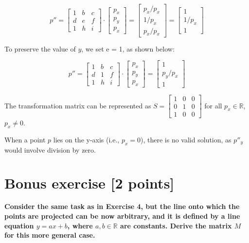 \documentclass{article}
\begin{document}
\[
    p'' = \begin{bmatrix} 1 & b & c \\ d & e & f \\ 1 & h & i \end{bmatrix} \cdot \begin{bmatrix} p_x \\ p_y \\ p_x \end{bmatrix} = \begin{bmatrix} p_x/p_x \\ 1/p_x \\ p_x / p_x \end{bmatrix} = \begin{bmatrix} 1 \\ 1 / p_x \\ 1 \end{bmatrix}
\]

To preserve the value of $y$, we set e = 1, as shown below:

\[
    p'' = \begin{bmatrix} 1 & b & c \\ d & 1 & f \\ 1 & h & i \end{bmatrix} \cdot \begin{bmatrix} p_x \\ p_y \\ p_x \end{bmatrix} = \begin{bmatrix} 1 \\ p_y / p_x \\ 1 \end{bmatrix}
\]

The transformation matrix can be represented as $ S = \begin{bmatrix} 1 & 0 & 0 \\ 0 & 1 & 0 \\ 1 & 0 & 0 \end{bmatrix} $ for all $p_x \in \mathbb{R}$, $p_x \neq 0$.

When a point $p$ lies on the y-axis (i.e., $p_x = 0$), there is no valid solution, as $p''_y$ would involve division by zero.



\cleardoublepage
\section*{Bonus exercise [2 points]}

\textbf{Consider the same task as in Exercise 4, but the line onto which the points are projected can be now arbitrary,
    and it is defined by a line equation $y = ax + b$, where $a, b \in \mathbb{R}$ are constants. Derive the matrix $M$ for this
    more general case.} \\
\end{document}

